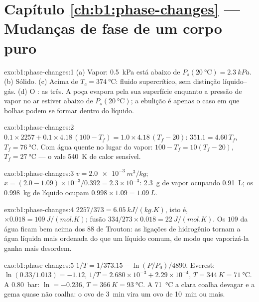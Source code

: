 \section*{Capítulo \ref{ch:b1:phase-changes} --- Mudanças de fase de um corpo puro}

\begin{solution}{exo:b1:phase-changes:1}
(a) Vapor: \qty{0.5}{kPa} está abaixo de $P_s(\qty{20}{\degreeCelsius}) = \qty{2.3}{kPa}$.
(b) Sólido. (c) Acima de $T_c = \qty{374}{\degreeCelsius}$: fluido supercrítico, sem
distinção líquido--gás. (d) O : as três. A poça
evapora pela sua superfície enquanto a pressão de vapor no ar
estiver abaixo de $P_s(\qty{20}{\degreeCelsius})$; a ebulição é apenas o caso em que
bolhas podem se formar dentro do líquido.
\end{solution}

\begin{solution}{exo:b1:phase-changes:2}
$0.1 \times 2257 + 0.1 \times 4.18\,(100 - T_f) = 1.0 \times 4.18\,(T_f - 20)$:
$351.1 = 4.60\,T_f$, $T_f = \qty{76}{\degreeCelsius}$. Com água quente
no lugar do vapor: $100 - T_f = 10(T_f - 20)$, $T_f = \qty{27}{\degreeCelsius}$ --- o
 vale \qty{540}{K} de calor sensível.
\end{solution}

\begin{solution}{exo:b1:phase-changes:3}
$v = \qty{2.0e-3}{m^3/kg}$; $x = (2.0 - 1.09) \times 10^{-3}/0.392 = 2.3 \times 10^{-3}$:
\qty{2.3}{g} de vapor ocupando \qty{0.91}{L}; os \qty{0.998}{kg} de líquido
ocupam $0.998 \times 1.09 = \qty{1.09}{L}$.
\end{solution}

\begin{solution}{exo:b1:phase-changes:4}
$2257/373 = \qty{6.05}{kJ/(kg.K)}$, isto é, $\times 0.018 = \qty{109}{J/(mol.K)}$;
fusão $334/273 \times 0.018 = \qty{22}{J/(mol.K)}$. Os $109$ da água ficam bem
acima dos $88$ de Trouton: as ligações de hidrogênio tornam a água líquida
mais ordenada do que um líquido comum, de modo que vaporizá-la ganha mais desordem.
\end{solution}

\begin{solution}{exo:b1:phase-changes:5}
$1/T = 1/373.15 - \ln(P/P_0)/4890$. Everest: $\ln(0.33/1.013) = -1.12$,
$1/T = 2.680 \times 10^{-3} + 2.29 \times 10^{-4}$, $T = \qty{344}{K} =
\qty{71}{\degreeCelsius}$. A \qty{0.80}{bar}: $\ln = -0.236$, $T = \qty{366}{K} =
\qty{93}{\degreeCelsius}$. A \qty{71}{\degreeCelsius} a clara coalha devagar
e a gema quase não coalha: o ovo de \qty{3}{min} vira um ovo de
\qty{10}{min} ou mais.
\end{solution}

